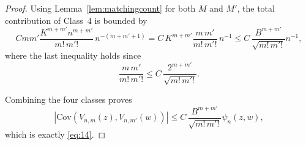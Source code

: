 \documentclass[10pt,a4paper]{amsart}
\newcommand{\cov}{\mathrm{Cov}}
\begin{document}
\begin{proof}
Using Lemma~\ref{lem:matchingcount} for both $M$ and $M'$, the total contribution of Class~4 is bounded by
\[
C m m'\frac{K^{m+m'} n^{m+m'}}{m!\,m'!}\,n^{-(m+m'+1)}
=
C\,K^{m+m'}\frac{m\,m'}{m!\,m'!}\,n^{-1}\leq C\,\frac{B^{m + m'}}{\sqrt{m!\,m'!}}n^{-1},
\]
where the last inequality holds since
\[
\frac{m\,m'}{m!\,m'!} \leq C\,\frac{2^{m + m'}}{\sqrt{m!\,m'!}}.
\]

Combining the four classes proves
\[
\left|
\cov\!\left(V_{n,m}(z),V_{n,m'}(w)\right)
\right|
\le
C\,\frac{B^{m+m'}}{\sqrt{m!\,m'!}}
\psi_n(z,w),
\]
which is exactly \eqref{eq:14}.
\end{proof}
\end{document}
